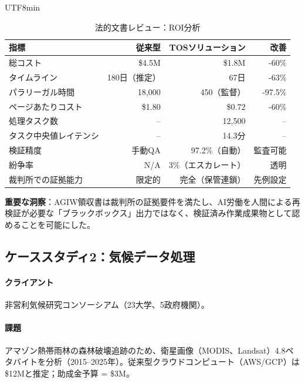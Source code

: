 \documentclass[11pt]{article}
\begin{document}
\begin{CJK}{UTF8}{min}
\begin{itemize}[noitemsep]
\begin{table}[H]
\centering
\caption{法的文書レビュー：ROI分析}
\label{tab:legal-roi}
\begin{tabular}{@{}lrrr@{}}
\toprule
\textbf{指標} & \textbf{従来型} & \textbf{TOSソリューション} & \textbf{改善} \\ \midrule
総コスト & \$4.5M & \$1.8M & -60\% \\
タイムライン & 180日（推定） & 67日 & -63\% \\
パラリーガル時間 & 18,000 & 450（監督） & -97.5\% \\
ページあたりコスト & \$1.80 & \$0.72 & -60\% \\
処理タスク数 & -- & 12,500 & -- \\
タスク中央値レイテンシ & -- & 14.3分 & -- \\
検証精度 & 手動QA & 97.2\%（自動） & 監査可能 \\
紛争率 & N/A & 3\%（エスカレート） & 透明 \\
裁判所での証拠能力 & 限定的 & 完全（保管連鎖） & 先例設定 \\
\bottomrule
\end{tabular}
\end{table}

\textbf{重要な洞察}：AGIW領収書は裁判所の証拠要件を満たし、AI労働を人間による再検証が必要な「ブラックボックス」出力ではなく、検証済み作業成果物として認めることを可能にした。

\subsection{ケーススタディ2：気候データ処理}

\paragraph{クライアント} 非営利気候研究コンソーシアム（23大学、5政府機関）。

\paragraph{課題} アマゾン熱帯雨林の森林破壊追跡のため、衛星画像（MODIS、Landsat）4.8ペタバイトを分析（2015--2025年）。従来型クラウドコンピュート（AWS/GCP）は\$12Mと推定；助成金予算 = \$3M。


\end{itemize}
\end{CJK}
\end{document}
